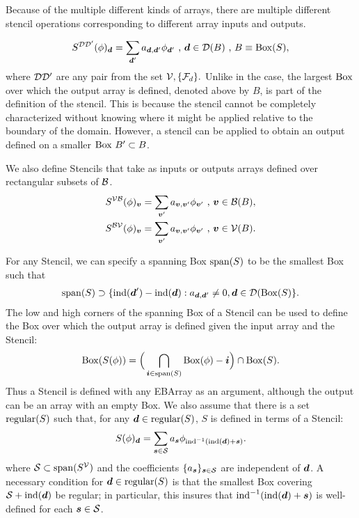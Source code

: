 \documentclass[12pt]{article}
\newcommand{\ind}{{\rm{ind}}}
\newcommand{\regular}{{\rm{regular}}}
\newcommand{\spanEB}{{\rm{span}}}
\newcommand{\vof}{{\mbf{v}}}
\newcommand{\dgen}{{\mbf{d}}}
\begin{document}
Because of the multiple different kinds of arrays, there are multiple different stencil operations corresponding to different array inputs and outputs. 

\begin{gather*}
S^{\mcl{D}\mcl{D'}}(\phi)_\dgen = \sum \limits_{\dgen'} a_{\dgen,\dgen'} \phi_{\dgen'} \cma \dgen \in \mcl{D}(B) \cma
B \equiv {\rm Box}(S),
\end{gather*}
where ${\mathcal{D}}{\mathcal{D}}'$ are any pair from the set ${\mathcal{V}},\{ {\mathcal{F}}_d\}.$ Unlike in the  case, the largest ${\rm Box}$ over which the output array is defined, denoted above by $B$, is part of the definition of the stencil. This is because the stencil cannot be completely characterized without knowing where it might be applied relative to the boundary of the domain. However, a stencil can be applied to obtain an output defined on a smaller ${\rm Box} ~ B' \subset B$. 

We also define Stencils that take as inputs or outputs arrays defined over rectangular subsets of ${\mathcal{B}}$.
\begin{gather*}
S^{\mcl{V}\mcl{B}}(\phi)_\vof = \sum \limits_{\vof '} a_{\vof,\vof'} \phi_{\vof'} \cma \vof \in \mcl{B}(B),  \\
S^{\mcl{B}\mcl{V}}(\phi)_\vof = \sum \limits_{\vof '} a_{\vof,\vof'} \phi_{\vof'} \cma \vof \in \mcl{V}(B) .
\end{gather*}

\noindent
For any Stencil, we can specify a spanning Box $\spanEB(S)$ to be the smallest Box such that 
\begin{gather*}
\spanEB(S) \supset \{\ind(\dgen') - \ind(\dgen):a_{\dgen,\dgen'} \neq 0, \dgen \in \mcl{D}(\MBox(S)\}.
\end{gather*}
The low and high corners of the spanning Box of a Stencil can be used to define the Box over which the output array is defined given the input array and the Stencil: 
\begin{gather*}
\MBox(S(\phi)) = \Big(\bigcap \limits_{\mbf{i} \in \spanEB(S)} \MBox(\phi) - \mbf{i} \Big) \cap \MBox(S).
\end{gather*}
Thus a Stencil is defined with any EBArray as an argument, although the output can be an array with an empty Box. 
We also assume that there is a set $\regular(S)$ such that, for any $\dgen \in \regular(S)$,  $S$ is defined in terms of a  Stencil: 
\begin{gather*}
S (\phi)_\dgen = \sum \limits_{\mbf{s} \in \mcl{S}} a_{\mbf{s}} \phi_{\ind^{-1}(\ind(\dgen) + \mbf{s})}.
\end{gather*}
where $\mcl{S} \subset \spanEB(S^\mcl{V})$ and the coefficients $\{a_{\boldsymbol{s}}\}_{{\boldsymbol{s}} \in {\mathcal{S}}}$ are independent of $\dgen$. A necessary condition for $\dgen \in \regular(S)$ is that the smallest Box covering $\mcl{S} + \ind(\dgen)$ be regular; in particular, this insures that $\ind^{-1}(\ind(\dgen) + \mbf{s})$ is well-defined for each ${\boldsymbol{s}} \in {\mathcal{S}}$. 
\end{document}
